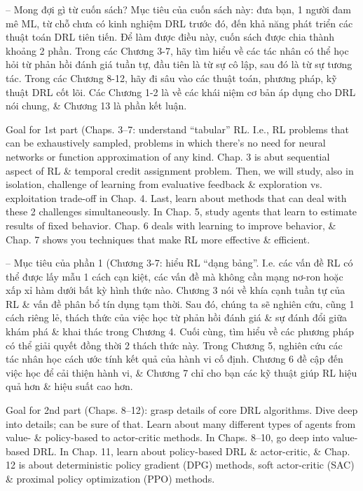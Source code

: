 \documentclass{article}
\begin{document}
\begin{itemize}
\begin{itemize}
\begin{itemize}
            -- {\sf Mong đợi gì từ cuốn sách?} Mục tiêu của cuốn sách này: đưa bạn, 1 người đam mê ML, từ chỗ chưa có kinh nghiệm DRL trước đó, đến khả năng phát triển các thuật toán DRL tiên tiến. Để làm được điều này, cuốn sách được chia thành khoảng 2 phần. Trong các Chương 3-7, hãy tìm hiểu về các tác nhân có thể học hỏi từ phản hồi đánh giá tuần tự, đầu tiên là từ sự cô lập, sau đó là từ sự tương tác. Trong các Chương 8-12, hãy đi sâu vào các thuật toán, phương pháp, kỹ thuật DRL cốt lõi. Các Chương 1-2 là về các khái niệm cơ bản áp dụng cho DRL nói chung, \& Chương 13 là phần kết luận.

            Goal for 1st part (Chaps. 3--7: understand ``tabular'' RL. I.e., RL problems that can be exhaustively sampled, problems in which there's no need for neural networks or function approximation of any kind. Chap. 3 is abut sequential aspect of RL \& temporal credit assignment problem. Then, we will study, also in isolation, challenge of learning from evaluative feedback \& exploration vs. exploitation trade-off in Chap. 4. Last, learn about methods that can deal with these 2 challenges simultaneously. In Chap. 5, study agents that learn to estimate results of fixed behavior. Chap. 6 deals with learning to improve behavior, \& Chap. 7 shows you techniques that make RL more effective \& efficient.

            -- Mục tiêu của phần 1 (Chương 3-7: hiểu RL ``dạng bảng''. I.e. các vấn đề RL có thể được lấy mẫu 1 cách cạn kiệt, các vấn đề mà không cần mạng nơ-ron hoặc xấp xỉ hàm dưới bất kỳ hình thức nào. Chương 3 nói về khía cạnh tuần tự của RL \& vấn đề phân bổ tín dụng tạm thời. Sau đó, chúng ta sẽ nghiên cứu, cũng 1 cách riêng lẻ, thách thức của việc học từ phản hồi đánh giá \& sự đánh đổi giữa khám phá \& khai thác trong Chương 4. Cuối cùng, tìm hiểu về các phương pháp có thể giải quyết đồng thời 2 thách thức này. Trong Chương 5, nghiên cứu các tác nhân học cách ước tính kết quả của hành vi cố định. Chương 6 đề cập đến việc học để cải thiện hành vi, \& Chương 7 chỉ cho bạn các kỹ thuật giúp RL hiệu quả hơn \& hiệu suất cao hơn.

            Goal for 2nd part (Chaps. 8--12): grasp details of core DRL algorithms. Dive deep into details; can be sure of that. Learn about many different types of agents from value- \& policy-based to actor-critic methods. In Chaps. 8--10, go deep into value-based DRL. In Chap. 11, learn about policy-based DRL \& actor-critic, \& Chap. 12 is about deterministic policy gradient (DPG) methods, soft actor-critic (SAC) \& proximal policy optimization (PPO) methods.


\end{itemize}
\end{itemize}
\end{itemize}
\end{document}
